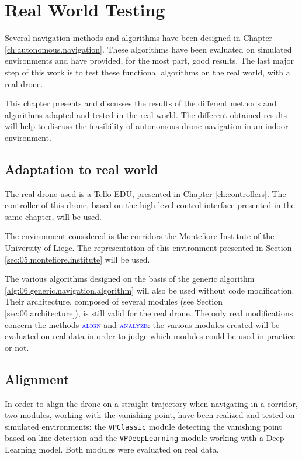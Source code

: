 \chapter{Real World Testing}\label{ch:real.world.testing}

Several navigation methods and algorithms have been designed in Chapter \ref{ch:autonomous.navigation}. These algorithms have been evaluated on simulated environments and have provided, for the most part, good results. The last major step of this work is to test these functional algorithms on the real world, with a real drone.

This chapter presents and discusses the results of the different methods and algorithms adapted and tested in the real world. The different obtained results will help to discuss the feasibility of autonomous drone navigation in an indoor environment.

\section{Adaptation to real world}

The real drone used is a Tello EDU, presented in Chapter \ref{ch:controllers}. The controller of this drone, based on the high-level control interface presented in the same chapter, will be used.

The environment considered is the corridors the Montefiore Institute of the University of Liege. The representation of this environment presented in Section \ref{sec:05.montefiore.institute} will be used.

The various algorithms designed on the basis of the generic algorithm \ref{alg:06.generic.navigation.algorithm} will also be used without code modification. Their architecture, composed of several modules (see Section \ref{sec:06.architecture}), is still valid for the real drone. The only real modifications concern the methods \textsc{\textcolor{blue}{align}} and \textsc{\textcolor{blue}{analyze}}: the various modules created will be evaluated on real data in order to judge which modules could be used in practice or not.

\section{Alignment}

In order to align the drone on a straight trajectory when navigating in a corridor, two modules, working with the vanishing point, have been realized and tested on simulated environments: the \texttt{VPClassic} module detecting the vanishing point based on line detection and the \texttt{VPDeepLearning} module working with a Deep Learning model. Both modules were evaluated on real data.

